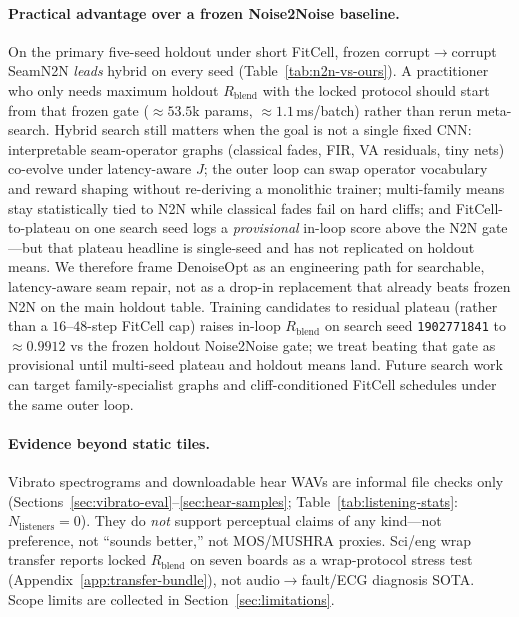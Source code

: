\paragraph{Practical advantage over a frozen Noise2Noise baseline.}
On the primary five-seed holdout under short FitCell, frozen corrupt$\to$corrupt SeamN2N \emph{leads} hybrid on every seed (Table~\ref{tab:n2n-vs-ours}).
A practitioner who only needs maximum holdout $R_{\mathrm{blend}}$ with the locked protocol should start from that frozen gate (${\approx}53.5$k params, ${\approx}1.1$\,ms/batch) rather than rerun meta-search.
Hybrid search still matters when the goal is not a single fixed CNN: interpretable seam-operator graphs (classical fades, FIR, VA residuals, tiny nets) co-evolve under latency-aware $J$; the outer loop can swap operator vocabulary and reward shaping without re-deriving a monolithic trainer; multi-family means stay statistically tied to N2N while classical fades fail on hard cliffs; and FitCell-to-plateau on one search seed logs a \emph{provisional} in-loop score above the N2N gate---but that plateau headline is single-seed and has not replicated on holdout means.
We therefore frame DenoiseOpt as an engineering path for searchable, latency-aware seam repair, not as a drop-in replacement that already beats frozen N2N on the main holdout table.
Training candidates to residual plateau (rather than a $16$--$48$-step FitCell cap) raises in-loop $R_{\mathrm{blend}}$ on search seed \texttt{1902771841} to ${\approx}0.9912$ vs the frozen holdout Noise2Noise gate; we treat beating that gate as provisional until multi-seed plateau and holdout means land.
Future search work can target family-specialist graphs and cliff-conditioned FitCell schedules under the same outer loop.

\paragraph{Evidence beyond static tiles.}
Vibrato spectrograms and downloadable hear WAVs are informal file checks only
(Sections~\ref{sec:vibrato-eval}--\ref{sec:hear-samples}; Table~\ref{tab:listening-stats}: $N_{\mathrm{listeners}}{=}0$).
They do \emph{not} support perceptual claims of any kind---not preference, not ``sounds better,'' not MOS/MUSHRA proxies.
Sci/eng wrap transfer reports locked $R_{\mathrm{blend}}$ on seven boards as a wrap-protocol stress test
(Appendix~\ref{app:transfer-bundle}), not audio$\to$fault/ECG diagnosis SOTA.
Scope limits are collected in Section~\ref{sec:limitations}.
